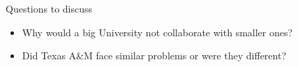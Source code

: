 \documentclass[12pt, onecolumn]{IEEEtran}
\begin{document}
\noindent Questions to discuss
\begin{itemize}
  \item Why would a big University not collaborate with smaller ones?
  \item Did Texas A&M face similar problems or were they different?
\end{itemize}
\bigskip\bigskip



\end{document}
